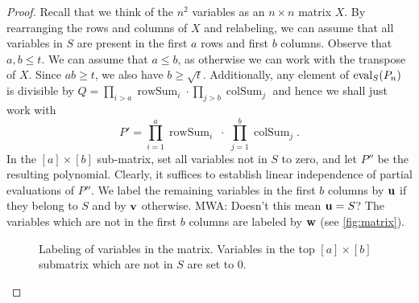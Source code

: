 \documentclass[11pt]{article}
\def\rowsum{\operatorname{rowSum}}
\def\colsum{\operatorname{colSum}}
\newcommand{\Mattnote}[1]{\textcolor{OliveGreen}{MWA: #1}}
\newcommand{\BLnote}[1]{\textcolor{Blue}{BLV: #1}}
\providecommand{\DIFadd}[1]{{\protect\color{blue}\uwave{#1}}} %
\providecommand{\DIFaddbegin}{} %
\providecommand{\DIFaddend}{} %
\begin{document}
\begin{proof}
Recall that we think of the $n^2$ variables as an $n\times n$ matrix $X$.
By rearranging the rows and columns of $X$ and relabeling, we can assume that all variables in $S$ are present in the first $a$ rows and first $b$ columns.
Observe that $a,b \leq t$.  We can assume that $a \leq b$, as otherwise we can work with the transpose of $X$.  Since $ab \ge t$, we also have $b \geq \sqrt{t}$.
Additionally, any element of $\operatorname{eval}_S(P_n)$ is divisible by $Q = \prod_{i>a} \rowsum_i \cdot \prod_{j > b} \colsum_j$ and hence we shall just work with 
\[
P' = \prod_{i=1}^a \rowsum_i \;\cdot\; \prod_{j=1}^b \colsum_j.
\]
In the $[a]\times[b]$ sub-matrix, set all variables not in $S$ to zero, and let $P''$ be the resulting polynomial.
Clearly, it suffices to establish linear independence of partial evaluations of $P''$. We label the remaining variables in the first $b$ columns by $\mathbf{u}$ if they belong to $S$ and by $\mathbf{v}$ otherwise. \Mattnote{Doesn't this mean $\mathbf{u} = S$?} \DIFaddbegin \DIFadd{\BLnote{I think it does} }\DIFaddend The variables which are not in the first $b$ columns are labeled by $\mathbf{w}$ (see \autoref{fig:matrix}).

\begin{figure}[h]
\begin{center}
\caption{Labeling of variables in the matrix. Variables in the top $[a] \times [b]$ submatrix which are not in $S$ are set to $0$.}
\label{fig:matrix}
\end{center}
\end{figure}


\end{proof}
\end{document}
